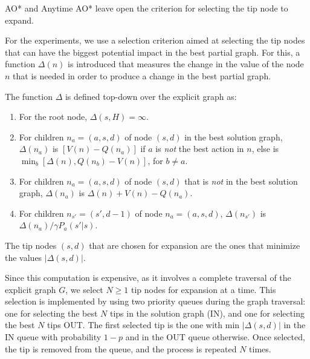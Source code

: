 \documentclass[letterpaper]{article}
\newcommand{\Omit}[1]{}
\begin{document}
AO* and Anytime AO* leave  open the criterion for selecting
the tip node to expand.
\Omit{
}
For the experiments, we  use a selection  criterion aimed at selecting the tip
nodes that can have the biggest potential impact in the best partial graph.
For this,    a  function $\Delta(n)$ is introduced that measures the change in the  value of the
node $n$ that is needed in order to produce a change in the  best partial graph.
\Omit{
Nodes that are part
of the best solution graph have non-negative $\Delta$'s, as their
$V$ or $Q$ values must increase for then being excluded from the
best solution graph. On the other hand, nodes that are not part
of the best solution graph have non-positive $\Delta$'s, as their
$V$ or $Q$ values must decrease for them becoming part of the
best solution graph. }
The function $\Delta$ is defined top-down over the explicit graph
as:

\begin{enumerate}[1.]
\item For the root node,  $\Delta(s,H)=\infty$.
\item For children $n_a = (a,s,d)$ of node $(s,d)$
in the best solution graph, $\Delta(n_a)$ is $[V(n)-Q(n_a)]$
if $a$ is \emph{not} the best action in $n$, else is
$\min_b[\Delta(n),Q(n_b)-V(n)]$, for $b \not= a$.
\item For children $n_a = (a,s,d)$ of node $(s,d)$
that is \emph{not} in the best solution graph, $\Delta(n_a)$ is $\Delta(n) + V(n) - Q(n_a)$.
\item For children $n_{s'} = (s',d-1)$ of node $n_a = (a,s,d)$, $\Delta(n_{s'})$
is $\Delta(n_a)/\gamma P_a(s'|s)$.
\end{enumerate}



The tip nodes  $(s,d)$ that are  chosen for expansion
are the ones that minimize  the values $|\Delta(s,d)|$.
\Omit{
if the choice is IN, they are selected among the tip nodes
in the best solution graph, if the choice is OUT, among those
not in the best solution graph.  }
Since this  computation is expensive, as  it involves a
complete traversal of the explicit graph $G$,
we select  $N\geq 1$ tip nodes for expansion at a time.
This selection  is implemented by using two priority queues during the graph traversal:
one for selecting the best $N$  tips in the solution graph (IN),  and one for selecting the best $N$ tips OUT.
The first selected tip  is the one with  min $|\Delta(s,d)|$ in the IN queue with  probability $1-p$ and in the OUT queue otherwise.
Once selected, the tip is removed from the queue, and the process is repeated $N$ times.%
\end{document}

